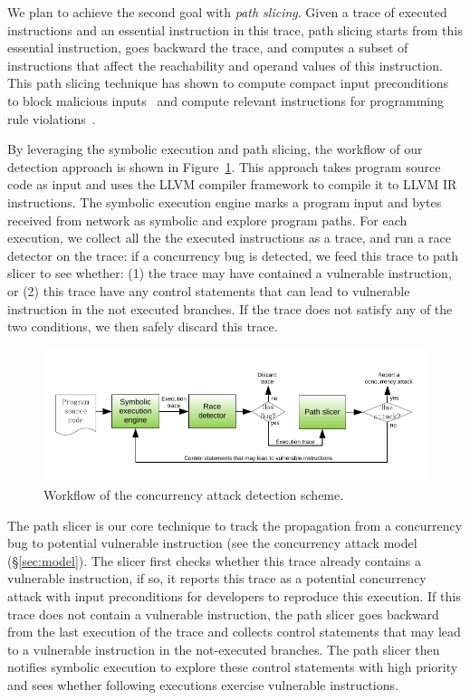 We plan to achieve the second goal with \emph{path slicing}. Given a 
trace of executed instructions and an essential instruction in this trace, 
path slicing starts from this essential instruction, goes backward the trace, 
and computes a subset of instructions that affect the reachability and operand 
values of this instruction. This path slicing technique has shown to compute 
compact input preconditions to block malicious inputs~\cite{castro:bouncer} and 
compute relevant instructions for programming rule 
violations~\cite{woodpecker:asplos13}.

By leveraging the symbolic execution and path slicing, the workflow of our 
detection approach is shown in Figure~\ref{fig:detection}. This approach takes 
program source code as input and uses the LLVM compiler framework to compile it 
to LLVM IR instructions. The symbolic execution engine marks a program input 
and bytes received from network as symbolic and explore program paths. For each 
execution, we collect all the the executed instructions as a trace, and run a 
race detector on the trace: if a concurrency bug is detected, we feed this 
trace to path slicer to see whether: (1) the trace may have contained a 
vulnerable instruction, or (2) this trace have any control statements that can 
lead to vulnerable instruction in the not executed branches. If the trace does 
not satisfy any of the two conditions, we then safely discard this trace.

\begin{figure}[ht]
\centering
\vspace{-.1in}
\includegraphics[width=0.8\columnwidth]{figures/detection}
\vspace{-.1in}
\caption{{Workflow of the concurrency attack detection scheme.}} 
\label{fig:detection}
\vspace{-.1in}
\end{figure}



The path slicer is our core technique to track the propagation from a 
concurrency bug to potential vulnerable instruction (see the concurrency attack 
model (\S\ref{sec:model}). The slicer first checks whether this trace already 
contains a vulnerable instruction, if so, it reports this trace as a potential 
concurrency attack with input preconditions for developers to reproduce this 
execution. If this trace does not contain a vulnerable instruction, the 
path slicer goes backward from the last execution of the trace and
collects control statements that may lead to a vulnerable instruction in the 
not-executed branches. The path slicer then notifies symbolic execution 
to explore these control statements with high priority and sees whether 
following executions exercise vulnerable instructions.

